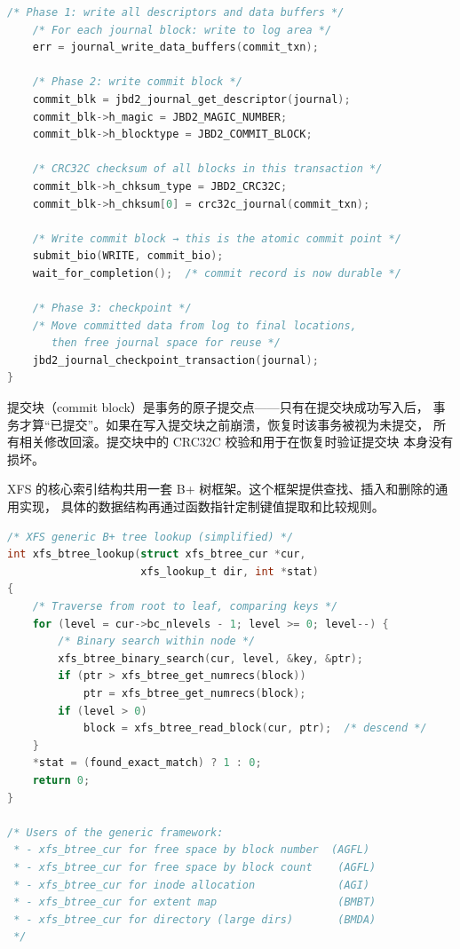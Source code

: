 \begin{filesystemlayout}
\begin{lstlisting}[language=C]
    /* Phase 1: write all descriptors and data buffers */
    /* For each journal block: write to log area */
    err = journal_write_data_buffers(commit_txn);

    /* Phase 2: write commit block */
    commit_blk = jbd2_journal_get_descriptor(journal);
    commit_blk->h_magic = JBD2_MAGIC_NUMBER;
    commit_blk->h_blocktype = JBD2_COMMIT_BLOCK;

    /* CRC32C checksum of all blocks in this transaction */
    commit_blk->h_chksum_type = JBD2_CRC32C;
    commit_blk->h_chksum[0] = crc32c_journal(commit_txn);

    /* Write commit block → this is the atomic commit point */
    submit_bio(WRITE, commit_bio);
    wait_for_completion();  /* commit record is now durable */

    /* Phase 3: checkpoint */
    /* Move committed data from log to final locations,
       then free journal space for reuse */
    jbd2_journal_checkpoint_transaction(journal);
}
\end{lstlisting}

提交块（commit block）是事务的原子提交点——只有在提交块成功写入后，
事务才算``已提交''。如果在写入提交块之前崩溃，恢复时该事务被视为未提交，
所有相关修改回滚。提交块中的 CRC32C 校验和用于在恢复时验证提交块
本身没有损坏。


XFS 的核心索引结构共用一套 B+ 树框架。这个框架提供查找、插入和删除的通用实现，
具体的数据结构再通过函数指针定制键值提取和比较规则。

\begin{lstlisting}[language=C]
/* XFS generic B+ tree lookup (simplified) */
int xfs_btree_lookup(struct xfs_btree_cur *cur,
                     xfs_lookup_t dir, int *stat)
{
    /* Traverse from root to leaf, comparing keys */
    for (level = cur->bc_nlevels - 1; level >= 0; level--) {
        /* Binary search within node */
        xfs_btree_binary_search(cur, level, &key, &ptr);
        if (ptr > xfs_btree_get_numrecs(block))
            ptr = xfs_btree_get_numrecs(block);
        if (level > 0)
            block = xfs_btree_read_block(cur, ptr);  /* descend */
    }
    *stat = (found_exact_match) ? 1 : 0;
    return 0;
}

/* Users of the generic framework:
 * - xfs_btree_cur for free space by block number  (AGFL)
 * - xfs_btree_cur for free space by block count    (AGFL)
 * - xfs_btree_cur for inode allocation             (AGI)
 * - xfs_btree_cur for extent map                   (BMBT)
 * - xfs_btree_cur for directory (large dirs)       (BMDA)
 */
\end{lstlisting}


\end{filesystemlayout}
